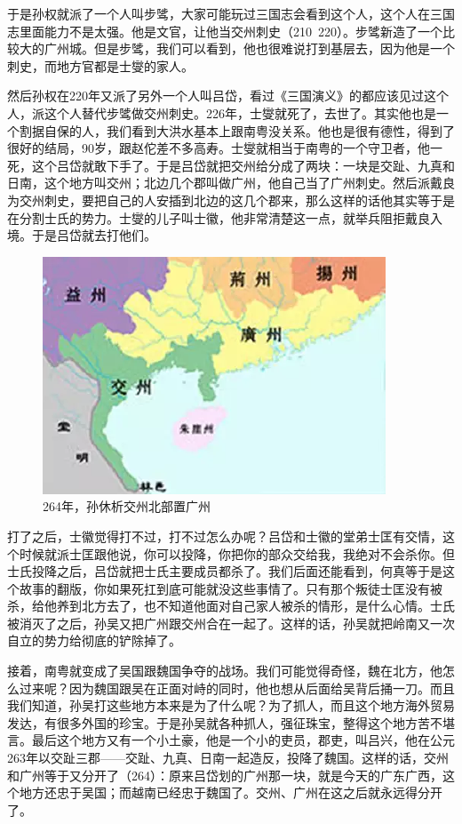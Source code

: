 于是孙权就派了一个人叫步骘，大家可能玩过三国志会看到这个人，这个人在三国志里面能力不是太强。他是文官，让他当交州刺史（210~220）。步骘新造了一个比较大的广州城。但是步骘，我们可以看到，他也很难说打到基层去，因为他是一个刺史，而地方官都是士燮的家人。

然后孙权在220年又派了另外一个人叫吕岱，看过《三国演义》的都应该见过这个人，派这个人替代步骘做交州刺史。226年，士燮就死了，去世了。其实他也是一个割据自保的人，我们看到大洪水基本上跟南粤没关系。他也是很有德性，得到了很好的结局，90岁，跟赵佗差不多高寿。士燮就相当于南粤的一个守卫者，他一死，这个吕岱就敢下手了。于是吕岱就把交州给分成了两块：一块是交趾、九真和日南，这个地方叫交州；北边几个郡叫做广州，他自己当了广州刺史。然后派戴良为交州刺史，要把自己的人安插到北边的这几个郡来，那么这样的话他其实等于是在分割士氏的势力。士燮的儿子叫士徽，他非常清楚这一点，就举兵阻拒戴良入境。于是吕岱就去打他们。

\begin{figure}
	\centering
	\includegraphics[width=\textwidth]{images/image-17}
	\caption{264年，孙休析交州北部置广州}
\end{figure}


打了之后，士徽觉得打不过，打不过怎么办呢？吕岱和士徽的堂弟士匡有交情，这个时候就派士匡跟他说，你可以投降，你把你的部众交给我，我绝对不会杀你。但士氏投降之后，吕岱就把士氏主要成员都杀了。我们后面还能看到，何真等于是这个故事的翻版，你如果死扛到底可能就没这些事情了。只有那个叛徒士匡没有被杀，给他养到北方去了，也不知道他面对自己家人被杀的情形，是什么心情。士氏被消灭了之后，孙吴又把广州跟交州合在一起了。这样的话，孙吴就把岭南又一次自立的势力给彻底的铲除掉了。

接着，南粤就变成了吴国跟魏国争夺的战场。我们可能觉得奇怪，魏在北方，他怎么过来呢？因为魏国跟吴在正面对峙的同时，他也想从后面给吴背后捅一刀。而且我们知道，孙吴打这些地方本来是为了什么呢？为了抓人，而且这个地方海外贸易发达，有很多外国的珍宝。于是孙吴就各种抓人，强征珠宝，整得这个地方苦不堪言。最后这个地方又有一个小土豪，他是一个小的吏员，郡吏，叫吕兴，他在公元263年以交趾三郡——交趾、九真、日南一起造反，投降了魏国。这样的话，交州和广州等于又分开了（264）：原来吕岱划的广州那一块，就是今天的广东广西，这个地方还忠于吴国；而越南已经忠于魏国了。交州、广州在这之后就永远得分开了。

